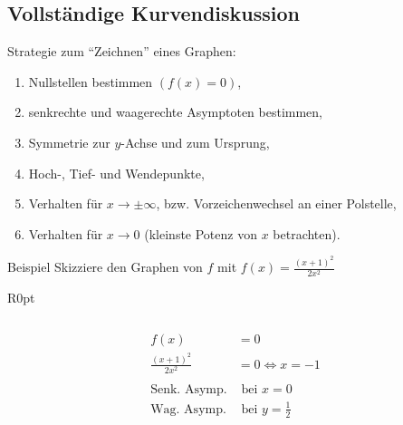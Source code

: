 \documentclass{article}
\begin{document}
\subsection{Vollständige Kurvendiskussion}
Strategie zum "`Zeichnen"' eines Graphen:
\begin{enumerate}
    \item Nullstellen bestimmen $\displaystyle \left(f(x) = 0\right)$,
    \item senkrechte und waagerechte Asymptoten bestimmen,
    \item Symmetrie zur $y$-Achse und zum Ursprung,
    \item Hoch-, Tief- und Wendepunkte,
    \item Verhalten für $\displaystyle x \to \pm \infty$, bzw. Vorzeichenwechsel an einer Polstelle,
    \item Verhalten für $x \to 0$ (kleinste Potenz von $x$ betrachten).
\end{enumerate}
\begin{boxx}[DarkBlue]{Beispiel}
    Skizziere den Graphen von $f$ mit $\displaystyle f(x) = \frac{(x+1)^2}{2x^2}$

    \begin{wrapfigure}{R}{0pt}
    \end{wrapfigure}
    \begin{align*}
        \\
        \\
        f(x) &= 0 \\
        \frac{(x+1)^2}{2x^2} &= 0 \Leftrightarrow x = -1 \\\\
        \text{Senk. Asymp.}&\text{ bei }  x = 0\\
        \text{Wag. Asymp.}&\text{ bei }  y = \frac{1}{2}
    \end{align*}
    \vspace{3cm}
\end{boxx}
\newpage
\end{document}
